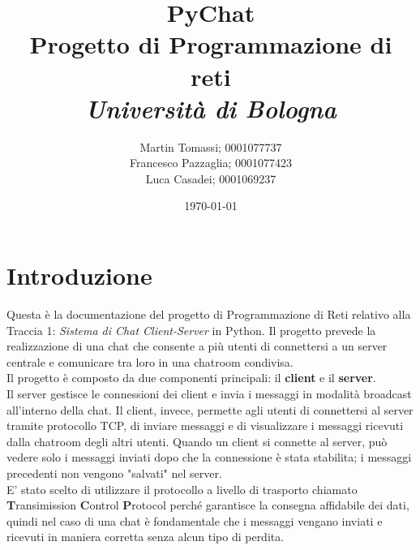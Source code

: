 \documentclass[a4paper,12pt]{report}
\title{\textbf{PyChat}\\Progetto di Programmazione di reti\\\textit{Università di Bologna}}
\author{Martin Tomassi; 0001077737\\Francesco Pazzaglia; 0001077423\\Luca Casadei; 0001069237}
\date{\today}
\begin{document}
\maketitle
\tableofcontents

\chapter{Introduzione}
Questa è la documentazione del progetto di Programmazione di Reti relativo alla Traccia 1: \textit{Sistema di Chat Client-Server} in Python. Il progetto prevede la realizzazione di una chat che consente a più utenti di connettersi a un server centrale e comunicare tra loro in una chatroom condivisa.\\
Il progetto è composto da due componenti principali: il \textbf{client} e il \textbf{server}.\\
Il server gestisce le connessioni dei client e invia i messaggi in modalità broadcast all'interno della chat. Il client, invece, permette agli utenti di connettersi al server tramite protocollo TCP, di inviare messaggi e di visualizzare i messaggi ricevuti dalla chatroom degli altri utenti. Quando un client si connette al server, può vedere solo i messaggi inviati dopo che la connessione è stata stabilita; i messaggi precedenti non vengono "salvati" nel server. \\
E' stato scelto di utilizzare il protocollo a livello di trasporto chiamato \textbf{T}ransimission \textbf{C}ontrol \textbf{P}rotocol perché garantisce la consegna affidabile dei dati, quindi nel caso di una chat è fondamentale che i messaggi vengano inviati e ricevuti in maniera corretta senza alcun tipo di perdita.
\end{document}
